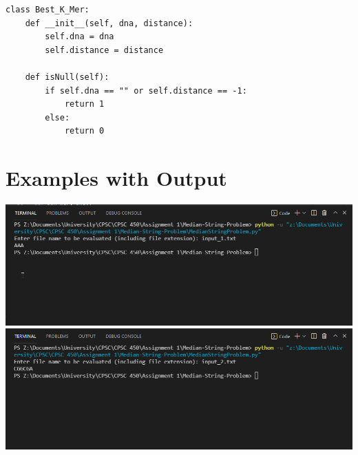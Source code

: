 \documentclass{article}
\begin{document}
\begin{lstlisting}
class Best_K_Mer:
    def __init__(self, dna, distance):
        self.dna = dna
        self.distance = distance

    def isNull(self):
        if self.dna == "" or self.distance == -1:
            return 1
        else:
            return 0
\end{lstlisting}

\pagebreak

\section*{Examples with Output}
\includegraphics[scale=0.5]{ExampleInput1.png}\\
\includegraphics[scale=0.5]{ExampleInput2.png}
\end{document}
